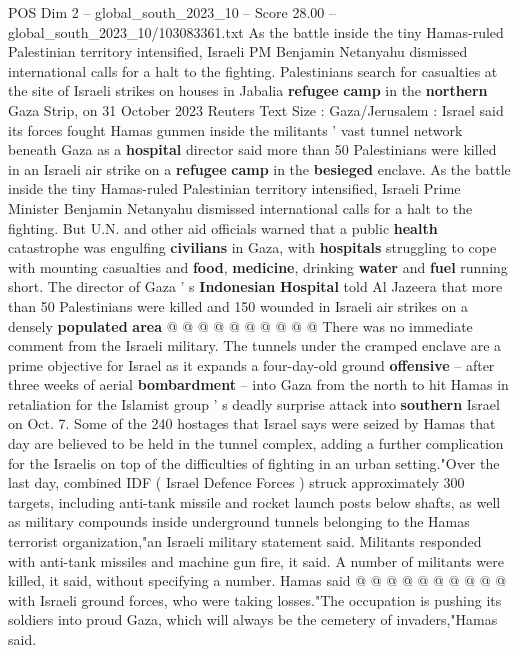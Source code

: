 \begin{textsample}{POS Dim 2 – global\_south\_2023\_10 – Score 28.00 – global\_south\_2023\_10/103083361.txt}  \label{ex:f2_pos_177}
As the battle inside the tiny Hamas-ruled Palestinian territory intensified, Israeli PM Benjamin Netanyahu dismissed international calls for a halt to the fighting.
Palestinians search for casualties at the site of Israeli strikes on houses in Jabalia \textbf{refugee} \textbf{camp} in the \textbf{northern} Gaza Strip, on 31 October 2023 Reuters Text Size : Gaza/Jerusalem : Israel said its forces fought Hamas gunmen inside the militants ' vast tunnel network beneath Gaza as a \textbf{hospital} director said more than 50 Palestinians were killed in an Israeli air strike on a \textbf{refugee} \textbf{camp} in the \textbf{besieged} enclave.
As the battle inside the tiny Hamas-ruled Palestinian territory intensified, Israeli Prime Minister Benjamin Netanyahu dismissed international calls for a halt to the fighting.
But U.N. and other aid officials warned that a public \textbf{health} catastrophe was engulfing \textbf{civilians} in Gaza, with \textbf{hospitals} struggling to cope with mounting casualties and \textbf{food}, \textbf{medicine}, drinking \textbf{water} and \textbf{fuel} running short.
The director of Gaza ' s \textbf{Indonesian} \textbf{Hospital} told Al Jazeera that more than 50 Palestinians were killed and 150 wounded in Israeli air strikes on a densely \textbf{populated} \textbf{area} @ @ @ @ @ @ @ @ @ @ There was no immediate comment from the Israeli military.
The tunnels under the cramped enclave are a prime objective for Israel as it expands a four-day-old ground \textbf{offensive} -- after three weeks of aerial \textbf{bombardment} -- into Gaza from the north to hit Hamas in retaliation for the Islamist group ' s deadly surprise attack into \textbf{southern} Israel on Oct. 7.
Some of the 240 hostages that Israel says were seized by Hamas that day are believed to be held in the tunnel complex, adding a further complication for the Israelis on top of the difficulties of fighting in an urban setting."Over the last day, combined IDF ( Israel Defence Forces ) struck approximately 300 targets, including anti-tank missile and rocket launch posts below shafts, as well as military compounds inside underground tunnels belonging to the Hamas terrorist organization,"an Israeli military statement said.
Militants responded with anti-tank missiles and machine gun fire, it said.
A number of militants were killed, it said, without specifying a number.
Hamas said @ @ @ @ @ @ @ @ @ @ with Israeli ground forces, who were taking losses."The occupation is pushing its soldiers into proud Gaza, which will always be the cemetery of invaders,"Hamas said.

\end{textsample}
